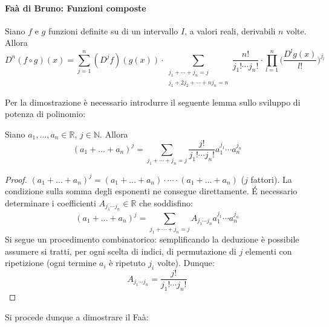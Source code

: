 \documentclass[10pt]{article}
\theoremstyle{plain}
\begin{document}
\paragraph{Faà di Bruno: Funzioni composte}
\begin{ther}
    Siano $f$ e $g$ funzioni definite su di un intervallo $I$, a valori reali, derivabili $n$ volte. Allora
    \[D^n(f\circ g)(x) = \sum \limits_{j = 1}^{n} (D^jf)(g(x)) \cdot \sum_{\substack{j_1 + \cdots + j_n = j \\ j_1 + 2 j_2 + \cdots + n j_n = n}} \frac{n!}{j_1! \cdots j_n!} \cdot \prod\limits_{l=1}^n\bigg(\frac{D^lg(x)}{l!}\bigg)^{j_l}\]
\end{ther}
Per la dimostrazione è necessario introdurre il seguente lemma sullo sviluppo di potenza di polinomio: 
\begin{lem}
Siano $a_1, ..., a_n \in \mathbb{R}$, $j \in \mathbb{N}$. Allora
\[(a_1 + ... + a_n)^j = \sum \limits_{j_1 + \cdots + j_n = j} \frac{j!}{j_1! \cdots j_n!}a_1^{j_1} \cdots a_n^{j_n}\]
\end{lem}
\begin{proof}
    $(a_1 + ... + a_n)^j = (a_1 + ... + a_n) \cdot \cdots \cdot (a_1 + ... + a_n)$ ($j$ fattori). La condizione sulla somma degli esponenti ne consegue direttamente. \'E necessario determinare i coefficienti $A_{j_1 \cdots j_n} \in \mathbb{R}$ che soddisfino:
    \[(a_1 + ... + a_n)^j = \sum \limits_{j_1 + \cdots + j_n = j} A_{j_1 \cdots j_n} a_1^{j_1} \cdots a_n^{j_n}\]
    Si segue un procedimento combinatorico: semplificando la deduzione è possibile assumere si tratti, per ogni scelta di indici, di permutazione di $j$ elementi con ripetizione (ogni termine $a_i$ è ripetuto $j_i$ volte). Dunque:
    \[A_{j_1 \cdots j_n} = \frac{j!}{j_1! \cdots j_n!}\]
\end{proof}
Si procede dunque a dimostrare il Faà:
\end{document}
